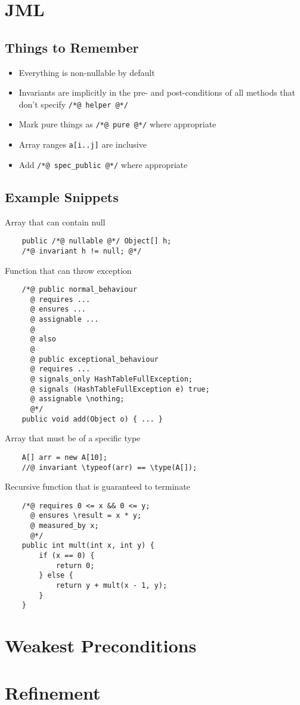 \documentclass[landscape]{cheat}
\begin{document}
\begin{multicols*}{3}
\section{JML}
\subsection{Things to Remember}
\begin{itemize}
    \item Everything is non-nullable by default
    \item Invariants are implicitly in the pre- and post-conditions of all methods that don't specify \texttt{/*@ helper @*/}
    \item Mark pure things as \texttt{/*@ pure @*/} where appropriate
    \item Array ranges \texttt{a[i..j]} are inclusive
    \item Add \texttt{/*@ spec\_public @*/} where appropriate
\end{itemize}

\subsection{Example Snippets}
Array that can contain null
\begin{lstlisting}
    public /*@ nullable @*/ Object[] h;
    /*@ invariant h != null; @*/
\end{lstlisting}

Function that can throw exception
\begin{lstlisting}
    /*@ public normal_behaviour
      @ requires ...
      @ ensures ...
      @ assignable ...
      @
      @ also
      @
      @ public exceptional_behaviour
      @ requires ...
      @ signals_only HashTableFullException;
      @ signals (HashTableFullException e) true;
      @ assignable \nothing;
      @*/
    public void add(Object o) { ... }
\end{lstlisting}

Array that must be of a specific type
\begin{lstlisting}
    A[] arr = new A[10];
    //@ invariant \typeof(arr) == \type(A[]);
\end{lstlisting}

Recursive function that is guaranteed to terminate
\begin{lstlisting}
    /*@ requires 0 <= x && 0 <= y;
      @ ensures \result = x * y;
      @ measured_by x;
      @*/
    public int mult(int x, int y) {
        if (x == 0) {
            return 0;
        } else {
            return y + mult(x - 1, y);
        }
    }
\end{lstlisting}

\section{Weakest Preconditions}

\section{Refinement}

\end{multicols*}
\end{document}
